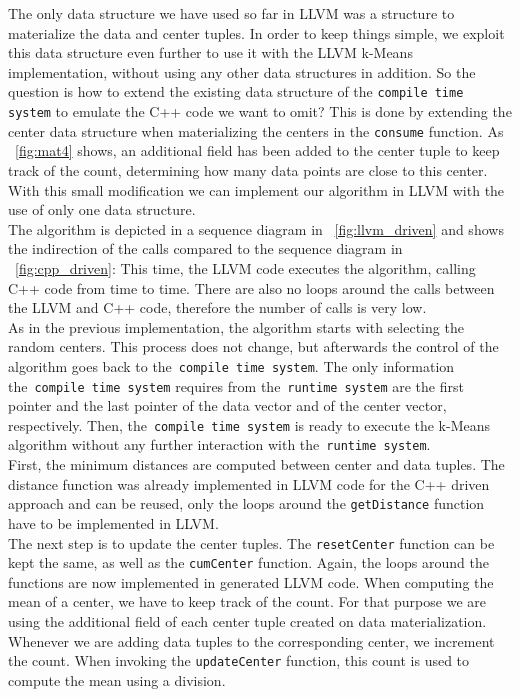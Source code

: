 The only data structure we have used so far in LLVM was a structure to materialize the data and center tuples. In order to keep things simple, we exploit this data structure even further to use it with the LLVM k-Means implementation, without using any other data structures in addition.
So the question is how to extend the existing data structure of the \texttt{compile time system} to emulate the C++ code we want to omit? This is done by extending the center data structure when materializing the centers in the \texttt{consume} function. As ~\autoref{fig:mat4} shows, an additional field has been added to the center tuple to keep track of the count, determining how many data points are close to this center. With this small modification we can implement our algorithm in LLVM with the use of only one data structure.
\\
The algorithm is depicted in a sequence diagram in ~\autoref{fig:llvm_driven} and shows the indirection of the calls compared to the sequence diagram in ~\autoref{fig:cpp_driven}: This time, the LLVM code executes the algorithm, calling C++ code from time to time. There are also no loops around the calls between the LLVM and C++ code, therefore the number of calls is very low. 
\\
As in the previous implementation, the algorithm starts with selecting the random centers. This process does not change, but afterwards the control of the algorithm goes back to the~\texttt{compile time system}. The only information the~\texttt{compile time system} requires from the~\texttt{runtime system} are the first pointer and the last pointer of the data vector and of the center vector, respectively. Then, the~\texttt{compile time system} is ready to execute the k-Means algorithm without any further interaction with the~\texttt{runtime system}. 
\\
First, the minimum distances are computed between center and data tuples. The distance function was already implemented in LLVM code for the C++ driven approach and can be reused, only the loops around the \texttt{getDistance} function have to be implemented in LLVM. 
\\
The next step is to update the center tuples. The \texttt{resetCenter} function can be kept the same, as well as the \texttt{cumCenter} function. Again, the loops around the functions are now implemented in generated LLVM code. When computing the mean of a center, we have to keep track of the count. For that purpose we are using the additional field of each center tuple created on data materialization. Whenever we are adding data tuples to the corresponding center, we increment the count. When invoking the \texttt{updateCenter} function, this count is used to compute the mean using a division. 



